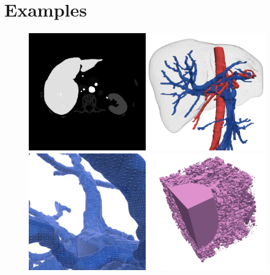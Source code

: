 
\section{Examples}\label{sec:examples}

\begin{figure}
\centering
\includegraphics[width=0.45\textwidth]{src/figs/ircad01_segmentation_65.png}
\includegraphics[width=0.45\textwidth]{src/figs/ircad01_liver_tricolore_01.png}
\includegraphics[width=0.45\textwidth]{src/figs/ircad01_porta_blue_01.png}
\includegraphics[width=0.45\textwidth]{src/figs/nrn10_200_pink_02.png}

\end{figure}
